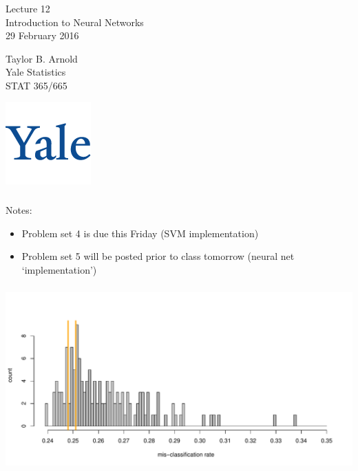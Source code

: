\documentclass[xetex,mathserif,serif,aspectratio=169]{beamer}
\begin{document}
\begin{frame}[fragile] \frametitle{} \oldB \small

\vfill

{\fontsize{0.7cm}{0cm}\selectfont Lecture 12 \\\vspace{0.2cm} Introduction to Neural Networks}\\\vspace{0.5cm}
29 February 2016

\vspace{2cm}

\begin{minipage}{0.6\textwidth}
Taylor B. Arnold \\
Yale Statistics \\
STAT 365/665
\end{minipage}
\hfill
\begin{minipage}{0.3\textwidth}\raggedleft
\includegraphics[scale=0.3]{../yale-logo.png}
\end{minipage}%

\end{frame}

\begin{frame}[fragile] \frametitle{} \oldB \small

Notes:
\begin{itemize}
\item Problem set 4 is due this Friday (SVM implementation)
\item Problem set 5 will be posted prior to class tomorrow
  (neural net `implementation')
\end{itemize}

\end{frame}

\begin{frame}[fragile] \frametitle{} \oldB \small

\begin{center}
\includegraphics[width=\textwidth]{img/misRatePset03.pdf}
\end{center}

\end{frame}
\end{document}
